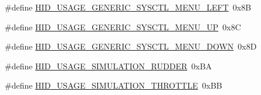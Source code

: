 \begin{DoxyCompactItemize}
\item 
\#define \hyperlink{group__USBD__HID_gaa990f6e260ec95f96240ed8c4e36b05a}{H\-I\-D\-\_\-\-U\-S\-A\-G\-E\-\_\-\-G\-E\-N\-E\-R\-I\-C\-\_\-\-S\-Y\-S\-C\-T\-L\-\_\-\-M\-E\-N\-U\-\_\-\-L\-E\-F\-T}~0x8\-B
\item 
\#define \hyperlink{group__USBD__HID_ga02512a2347c4327b90c53f9385804385}{H\-I\-D\-\_\-\-U\-S\-A\-G\-E\-\_\-\-G\-E\-N\-E\-R\-I\-C\-\_\-\-S\-Y\-S\-C\-T\-L\-\_\-\-M\-E\-N\-U\-\_\-\-U\-P}~0x8\-C
\item 
\#define \hyperlink{group__USBD__HID_ga234727e438e810c8bf7d30a98c0ab2b0}{H\-I\-D\-\_\-\-U\-S\-A\-G\-E\-\_\-\-G\-E\-N\-E\-R\-I\-C\-\_\-\-S\-Y\-S\-C\-T\-L\-\_\-\-M\-E\-N\-U\-\_\-\-D\-O\-W\-N}~0x8\-D
\end{DoxyCompactItemize}
\begin{DoxyCompactItemize}
\item 
\#define \hyperlink{group__USBD__HID_gab530d25dfff496c8f0ad9326f831ee44}{H\-I\-D\-\_\-\-U\-S\-A\-G\-E\-\_\-\-S\-I\-M\-U\-L\-A\-T\-I\-O\-N\-\_\-\-R\-U\-D\-D\-E\-R}~0x\-B\-A
\item 
\#define \hyperlink{group__USBD__HID_ga65a1aadacf2b4f12a61f457786bdaf1c}{H\-I\-D\-\_\-\-U\-S\-A\-G\-E\-\_\-\-S\-I\-M\-U\-L\-A\-T\-I\-O\-N\-\_\-\-T\-H\-R\-O\-T\-T\-L\-E}~0x\-B\-B
\end{DoxyCompactItemize}
